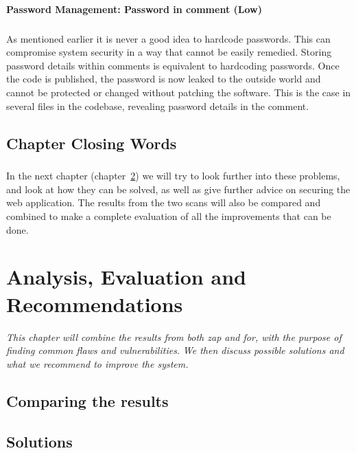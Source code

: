 \documentclass[11pt,english,a4paper]{report}
\begin{document}
\subsubsection{Password Management: Password in comment (Low)}
\paragraph{}
As mentioned earlier it is never a good idea to hardcode passwords. 
This can compromise system security in a way that cannot be easily remedied.
Storing password details within comments is equivalent to hardcoding passwords.
Once the code is published, the password is now leaked to the outside world and cannot be protected or changed without patching the software. 
This is the case in several files in the codebase, revealing password details in the comment.


\section{Chapter Closing Words}
\paragraph{}
In the next chapter (chapter~\ref{cha:part4}) we will try to look further into these problems, and look at how they can be solved, as well as give further advice on securing the web application.
The results from the two scans will also be compared and combined to make a complete evaluation of all the improvements that can be done.


\chapter{Analysis, Evaluation and Recommendations}
\label{cha:part4}

\textit{This chapter will combine the results from both \gls{zap} and \gls{for}, with the purpose of finding common flaws and vulnerabilities.}
\textit{We then discuss possible solutions and what we recommend to improve the system.}

\section{Comparing the results}

\section{Solutions}
\end{document}
